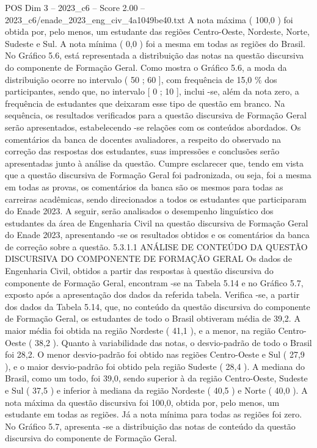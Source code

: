 \begin{textsample}{POS Dim 3 – 2023\_c6 – Score 2.00 – 2023\_c6/enade\_2023\_eng\_civ\_4a1049be40.txt}
A nota máxima ( 100,0 ) foi obtida por, pelo menos, um estudante das regiões Centro-Oeste, Nordeste, Norte, Sudeste e Sul.
A nota mínima ( 0,0 ) foi a mesma em todas as regiões do Brasil.
No Gráfico 5.6, está representada a distribuição das notas na questão discursiva do componente de Formação Geral.
Como mostra o Gráfico 5.6, a moda da distribuição ocorre no intervalo ( 50 ; 60 ], com frequência de 15,0 \% dos participantes, sendo que, no intervalo [ 0 ; 10 ], inclui -se, além da nota zero, a frequência de estudantes que deixaram esse tipo de questão em branco.
Na sequência, os resultados verificados para a questão discursiva de Formação Geral serão apresentados, estabelecendo -se relações com os conteúdos abordados.
Os comentários da banca de docentes avaliadores, a respeito do observado na correção das respostas dos estudantes, suas impressões e conclusões serão apresentadas junto à análise da questão.
Cumpre esclarecer que, tendo em vista que a questão discursiva de Formação Geral foi padronizada, ou seja, foi a mesma em todas as provas, os comentários da banca são os mesmos para todas as carreiras acadêmicas, sendo direcionados a todos os estudantes que participaram do Enade 2023.
A seguir, serão analisados o desempenho linguístico dos estudantes da área de Engenharia Civil na questão discursiva de Formação Geral do Enade 2023, apresentando -se os resultados obtidos e os comentários da banca de correção sobre a questão. 5.3.1.1 ANÁLISE DE CONTEÚDO DA QUESTÃO DISCURSIVA DO COMPONENTE DE FORMAÇÃO GERAL Os dados de Engenharia Civil, obtidos a partir das respostas à questão discursiva do componente de Formação Geral, encontram -se na Tabela 5.14 e no Gráfico 5.7, exposto após a apresentação dos dados da referida tabela.
Verifica -se, a partir dos dados da Tabela 5.14, que, no conteúdo da questão discursiva do componente de Formação Geral, os estudantes de todo o Brasil obtiveram média de 39,2.
A maior média foi obtida na região Nordeste ( 41,1 ), e a menor, na região Centro-Oeste ( 38,2 ).
Quanto à variabilidade das notas, o desvio-padrão de todo o Brasil foi 28,2.
O menor desvio-padrão foi obtido nas regiões Centro-Oeste e Sul ( 27,9 ), e o maior desvio-padrão foi obtido pela região Sudeste ( 28,4 ).
A mediana do Brasil, como um todo, foi 39,0, sendo superior à da região Centro-Oeste, Sudeste e Sul ( 37,5 ) e inferior à mediana da região Nordeste ( 40,5 ) e Norte ( 40,0 ).
A nota máxima da questão discursiva foi 100,0, obtida por, pelo menos, um estudante em todas as regiões.
Já a nota mínima para todas as regiões foi zero.
No Gráfico 5.7, apresenta -se a distribuição das notas de conteúdo da questão discursiva do componente de Formação Geral.

\end{textsample}
